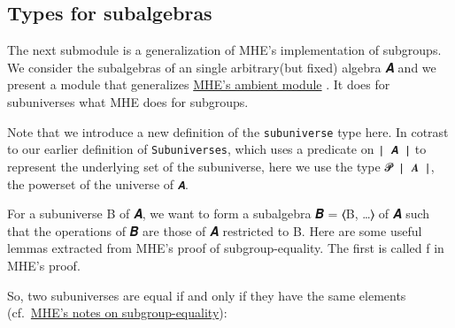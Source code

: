 \documentclass[a4paper,USenglish,cleveref,autoref,thm-restate]{lipics-v2019}
\begin{document}

\subsection{Types for subalgebras}\label{types-for-subalgebras}
The next submodule is a generalization of MHE's implementation of subgroups. We consider the subalgebras of an single arbitrary(but fixed) algebra 𝑨 and we present a module that generalizes \href{https://www.cs.bham.ac.uk/~mhe/HoTT-UF-in-Agda-Lecture-Notes/HoTT-UF-Agda.html\#subgroups-sip}{MHE's ambient module} . It does for subuniverses what MHE does for subgroups.
\begin{code}\end{code}

Note that we introduce a new definition of the \texttt{subuniverse} type here. In cotrast to our earlier definition of \texttt{Subuniverses}, which uses a predicate on \texttt{∣\ 𝑨\ ∣} to represent the underlying set of the subuniverse, here we use the type \texttt{𝓟\ ∣\ 𝑨\ ∣}, the powerset of the universe of \texttt{𝑨}.
\begin{code}\end{code}

For a subuniverse B of 𝑨, we want to form a subalgebra 𝑩 = ⟨B, \ldots{}⟩ of 𝑨 such that the operations of 𝑩 are those of 𝑨 restricted to B. Here are some useful lemmas extracted from MHE's proof of subgroup-equality. The first is called f in MHE's proof.
\begin{code}\end{code}

So, two subuniverses are equal if and only if they have the same elements (cf.~\href{https://www.cs.bham.ac.uk/~mhe/HoTT-UF-in-Agda-Lecture-Notes/HoTT-UF-Agda.html\#371022}{MHE's notes on subgroup-equality}):
\begin{code}\end{code}
\end{document}
